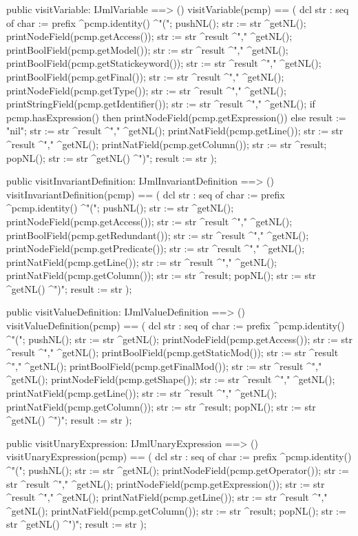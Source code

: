 \begin{vdm_al}
  public visitVariable: IJmlVariable ==> ()
  visitVariable(pcmp) ==
    ( dcl str : seq of char := prefix ^pcmp.identity() ^"(";
      pushNL();
      str := str ^getNL();
      printNodeField(pcmp.getAccess());
      str := str ^result ^"," ^getNL();
      printBoolField(pcmp.getModel());
      str := str ^result ^"," ^getNL();
      printBoolField(pcmp.getStatickeyword());
      str := str ^result ^"," ^getNL();
      printBoolField(pcmp.getFinal());
      str := str ^result ^"," ^getNL();
      printNodeField(pcmp.getType());
      str := str ^result ^"," ^getNL();
      printStringField(pcmp.getIdentifier());
      str := str ^result ^"," ^getNL();
      if pcmp.hasExpression()
      then printNodeField(pcmp.getExpression())
      else result := "nil";
      str := str ^result ^"," ^getNL();
      printNatField(pcmp.getLine());
      str := str ^result ^"," ^getNL();
      printNatField(pcmp.getColumn());
      str := str ^result;
      popNL();
      str := str ^getNL() ^")";
      result := str );

  public visitInvariantDefinition: IJmlInvariantDefinition ==> ()
  visitInvariantDefinition(pcmp) ==
    ( dcl str : seq of char := prefix ^pcmp.identity() ^"(";
      pushNL();
      str := str ^getNL();
      printNodeField(pcmp.getAccess());
      str := str ^result ^"," ^getNL();
      printBoolField(pcmp.getRedundant());
      str := str ^result ^"," ^getNL();
      printNodeField(pcmp.getPredicate());
      str := str ^result ^"," ^getNL();
      printNatField(pcmp.getLine());
      str := str ^result ^"," ^getNL();
      printNatField(pcmp.getColumn());
      str := str ^result;
      popNL();
      str := str ^getNL() ^")";
      result := str );

  public visitValueDefinition: IJmlValueDefinition ==> ()
  visitValueDefinition(pcmp) ==
    ( dcl str : seq of char := prefix ^pcmp.identity() ^"(";
      pushNL();
      str := str ^getNL();
      printNodeField(pcmp.getAccess());
      str := str ^result ^"," ^getNL();
      printBoolField(pcmp.getStaticMod());
      str := str ^result ^"," ^getNL();
      printBoolField(pcmp.getFinalMod());
      str := str ^result ^"," ^getNL();
      printNodeField(pcmp.getShape());
      str := str ^result ^"," ^getNL();
      printNatField(pcmp.getLine());
      str := str ^result ^"," ^getNL();
      printNatField(pcmp.getColumn());
      str := str ^result;
      popNL();
      str := str ^getNL() ^")";
      result := str );

  public visitUnaryExpression: IJmlUnaryExpression ==> ()
  visitUnaryExpression(pcmp) ==
    ( dcl str : seq of char := prefix ^pcmp.identity() ^"(";
      pushNL();
      str := str ^getNL();
      printNodeField(pcmp.getOperator());
      str := str ^result ^"," ^getNL();
      printNodeField(pcmp.getExpression());
      str := str ^result ^"," ^getNL();
      printNatField(pcmp.getLine());
      str := str ^result ^"," ^getNL();
      printNatField(pcmp.getColumn());
      str := str ^result;
      popNL();
      str := str ^getNL() ^")";
      result := str );


\end{vdm_al}
